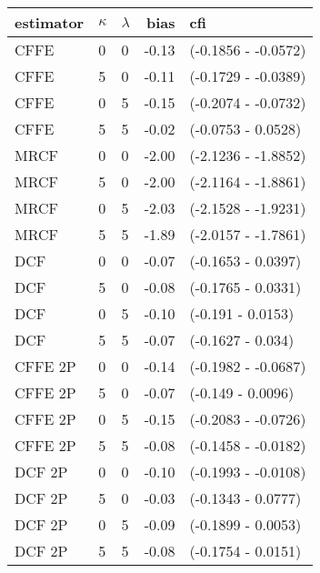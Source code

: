 \begin{tabular}{lllrl}
  \hline
estimator & $\kappa$ & $\lambda$ & bias & cfi \\ 
  \hline
CFFE  & 0 & 0 & -0.13 & (-0.1856 - -0.0572) \\ 
  CFFE  & 5 & 0 & -0.11 & (-0.1729 - -0.0389) \\ 
  CFFE  & 0 & 5 & -0.15 & (-0.2074 - -0.0732) \\ 
  CFFE  & 5 & 5 & -0.02 & (-0.0753 - 0.0528) \\ 
  MRCF  & 0 & 0 & -2.00 & (-2.1236 - -1.8852) \\ 
  MRCF  & 5 & 0 & -2.00 & (-2.1164 - -1.8861) \\ 
  MRCF  & 0 & 5 & -2.03 & (-2.1528 - -1.9231) \\ 
  MRCF  & 5 & 5 & -1.89 & (-2.0157 - -1.7861) \\ 
  DCF  & 0 & 0 & -0.07 & (-0.1653 - 0.0397) \\ 
  DCF  & 5 & 0 & -0.08 & (-0.1765 - 0.0331) \\ 
  DCF  & 0 & 5 & -0.10 & (-0.191 - 0.0153) \\ 
  DCF  & 5 & 5 & -0.07 & (-0.1627 - 0.034) \\ 
  CFFE 2P  & 0 & 0 & -0.14 & (-0.1982 - -0.0687) \\ 
  CFFE 2P  & 5 & 0 & -0.07 & (-0.149 - 0.0096) \\ 
  CFFE 2P  & 0 & 5 & -0.15 & (-0.2083 - -0.0726) \\ 
  CFFE 2P  & 5 & 5 & -0.08 & (-0.1458 - -0.0182) \\ 
  DCF 2P  & 0 & 0 & -0.10 & (-0.1993 - -0.0108) \\ 
  DCF 2P  & 5 & 0 & -0.03 & (-0.1343 - 0.0777) \\ 
  DCF 2P  & 0 & 5 & -0.09 & (-0.1899 - 0.0053) \\ 
  DCF 2P  & 5 & 5 & -0.08 & (-0.1754 - 0.0151) \\ 
   \hline
\end{tabular}
